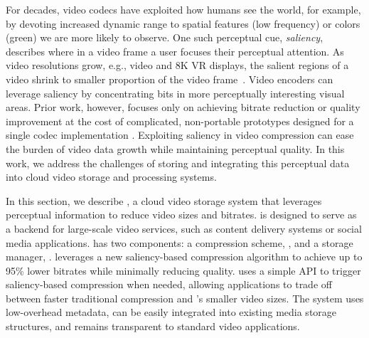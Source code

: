 

For decades, video codecs have exploited how humans see the world, for example, by devoting increased dynamic range to spatial features (low frequency) or colors (green) we are more likely to observe.
One such perceptual cue, \emph{saliency}, describes where in a video frame a user focuses their perceptual attention.
As video resolutions grow, e.g., \threesixty video and 8K VR displays, the salient regions of a video shrink to smaller proportion of the video frame~\cite{sitzmann2018saliency}.
Video encoders can leverage saliency by concentrating bits in more perceptually interesting visual areas.
Prior work, however, focuses only on achieving bitrate reduction or quality improvement at the cost of complicated, non-portable prototypes designed for a single codec implementation \cite{li2011visual,hadizadeh2014vidcomp,8117038,5223506}.
Exploiting saliency in video compression can ease the burden of video data growth while maintaining perceptual quality.
In this work, we address the challenges of storing and integrating this perceptual data into cloud video storage and processing systems.


In this section, we describe \name, a cloud video storage system that leverages perceptual information to reduce video sizes and bitrates.
\name is designed to serve as a backend for large-scale video services, such as content delivery systems or social media applications.
\name has two components: a compression scheme, \textit{\nameCompress}, and a storage manager, \textit{\nameStore}.
\nameCompress leverages a new saliency-based compression algorithm to achieve up to 95\% lower bitrates while minimally reducing quality.
\nameStore uses a simple API to trigger saliency-based compression when needed, allowing applications to trade off between faster traditional compression and \name's smaller video sizes.
The system uses low-overhead metadata, can be easily integrated into existing media storage structures, and remains transparent to standard video applications.

